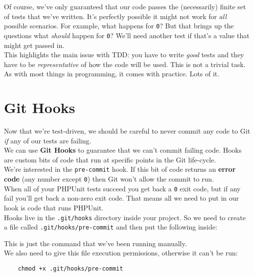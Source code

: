 Of course, we've only guaranteed that our code passes the (necessarily) finite set of tests that we've written. It's perfectly possible it might not work for \textit{all} possible scenarios. For example, what happens for \texttt{0}? But that brings up the questions what \textit{should} happen for \texttt{0}? We'll need another test if that's a value that might get passed in.
\\

This highlights the main issue with TDD: you have to write \textit{good} tests and they have to be \textit{representative} of how the code will be used. This is not a trivial task. As with most things in programming, it comes with practice. Lots of it.



\section{Git Hooks}

Now that we're test-driven, we should be careful to never commit any code to Git \textit{if} any of our tests are failing.
\\

We can use \textbf{Git Hooks} to guarantee that we can't commit failing code. Hooks are custom bits of code that run at specific points in the Git life-cycle.
\\

We're interested in the \texttt{pre-commit} hook. If this bit of code returns an \textbf{error code} (any number except \texttt{0}) then Git won't allow the commit to run.
\\

When all of your PHPUnit tests succeed you get back a \texttt{0} exit code, but if any fail you'll get back a non-zero exit code. That means all we need to put in our hook is code that runs PHPUnit.
\\

Hooks live in the \texttt{.git/hooks} directory inside your project. So we need to create a file called \texttt{.git/hooks/pre-commit} and then put the following inside:


This is just the command that we've been running manually.
\\

We also need to give this file execution permissions, otherwise it can't be run:

\begin{verbatim}
    chmod +x .git/hooks/pre-commit
\end{verbatim}

